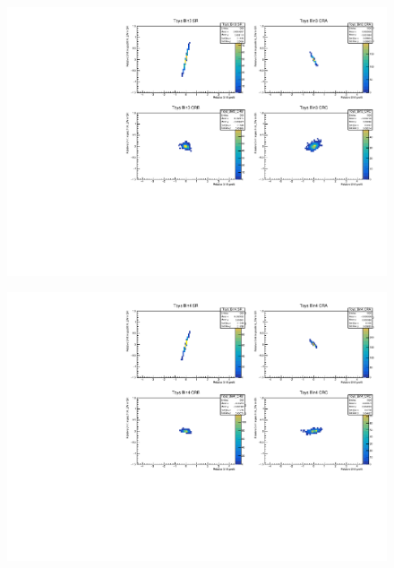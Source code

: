 \begin{figure}[H]
\includegraphics[width=\textwidth]{plots/diffx/instab/constfx/instabilities_mjj_QCD_Sh2211_Signal_Sh2211_BSDATASTATS_sherpaasimov_bin3.pdf}
\end{figure}
\begin{figure}[H]
\includegraphics[width=\textwidth]{plots/diffx/instab/constfx/instabilities_mjj_QCD_Sh2211_Signal_Sh2211_BSDATASTATS_sherpaasimov_bin4.pdf}
\end{figure}

